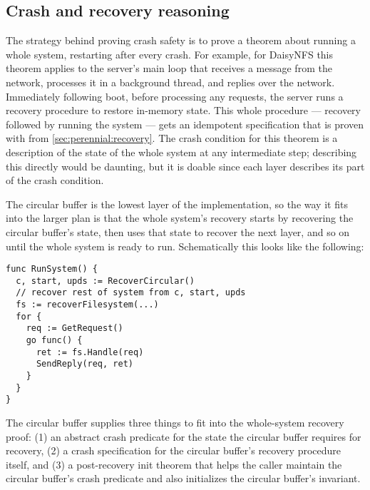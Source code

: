\subsection{Crash and recovery reasoning}
\label{sec:perennial:recovery-spec}


The strategy behind proving crash safety is to prove a theorem about running a
whole system, restarting after every crash. For example, for DaisyNFS this
theorem applies to the server's main loop that receives a message from the
network, processes it in a background thread, and replies over the network.
Immediately following boot, before processing any requests, the server runs a
recovery procedure to restore in-memory state. This whole procedure --- recovery
followed by running the system --- gets an idempotent specification that is
proven with  from \cref{sec:perennial:recovery}. The
crash condition for this theorem is a description of the state of the whole
system at any intermediate step; describing this directly would be daunting, but
it is doable since each layer describes its part of the crash condition.

The circular buffer is the lowest layer of the implementation, so the way it
fits into the larger plan is that the whole system's recovery starts by
recovering the circular buffer's state, then uses that state to recover the next
layer, and so on until the whole system is ready to run. Schematically this
looks like the following:
%
\begin{verbatim}
func RunSystem() {
  c, start, upds := RecoverCircular()
  // recover rest of system from c, start, upds
  fs := recoverFilesystem(...)
  for {
    req := GetRequest()
    go func() {
      ret := fs.Handle(req)
      SendReply(req, ret)
    }
  }
}
\end{verbatim}

The circular buffer supplies three things to fit into the whole-system
recovery proof: (1) an abstract crash predicate for the state the circular
buffer requires for recovery, (2) a crash specification for the circular
buffer's recovery procedure itself, and (3) a post-recovery init theorem that
helps the caller maintain the circular buffer's crash predicate and also
initializes the circular buffer's invariant.

